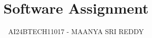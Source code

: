 \documentclass[journal]{IEEEtran}
\begin{document}

\vspace{3cm}

\title{Software Assignment}
\author{AI24BTECH11017 - MAANYA SRI REDDY
}
{\let\newpage\relax\maketitle}

\renewcommand{\thefigure}{\theenumi}
\renewcommand{\thetable}{\theenumi}
\setlength{\intextsep}{10pt} %


\renewcommand{\thetable}{\theenumi}
\end{document}
